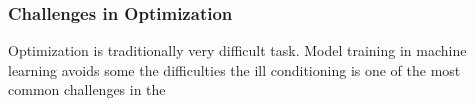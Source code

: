 \subsubsection{Challenges in Optimization}

Optimization is traditionally very difficult task. Model training in machine learning avoids some the difficulties 
the ill conditioning is one of the most common challenges in the 